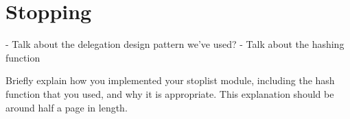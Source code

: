
\section{Stopping}
\label{sec:stopping}

- Talk about the delegation design pattern we've used?
- Talk about the hashing function

Briefly explain how you implemented your stoplist module, including the hash function that you used, and why it is appropriate. This explanation should be around half a page in length.